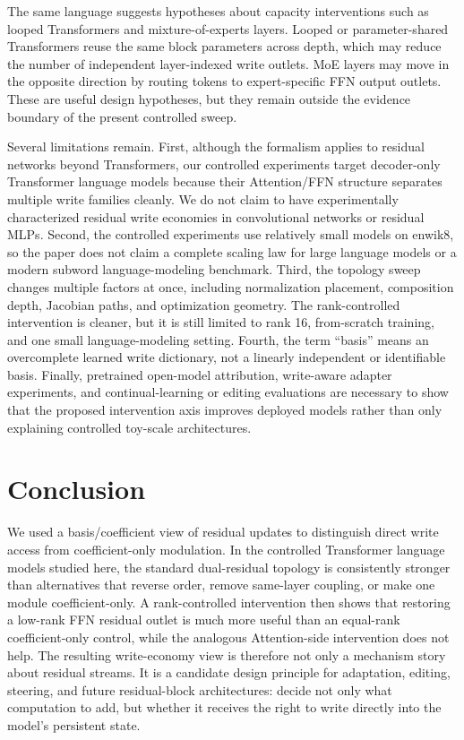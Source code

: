 \documentclass[letterpaper]{article}
\begin{document}
The same language suggests hypotheses about capacity interventions such as
looped Transformers and mixture-of-experts layers. Looped or parameter-shared
Transformers reuse the same block parameters across depth, which may reduce the
number of independent layer-indexed write outlets. MoE layers may move in the
opposite direction by routing tokens to expert-specific FFN output outlets.
These are useful design hypotheses, but they remain outside the evidence
boundary of the present controlled sweep.

Several limitations remain. First, although the formalism applies to residual
networks beyond Transformers, our controlled experiments target decoder-only
Transformer language models because their Attention/FFN structure separates
multiple write families cleanly. We do not claim to have experimentally
characterized residual write economies in convolutional networks or residual
MLPs. Second, the controlled experiments use relatively small models on enwik8,
so the paper does not claim a complete scaling law for large language models or
a modern subword language-modeling benchmark. Third, the topology sweep changes
multiple factors at once, including normalization placement, composition depth,
Jacobian paths, and optimization geometry. The rank-controlled intervention is
cleaner, but it is still limited to rank 16, from-scratch training, and one
small language-modeling setting. Fourth, the term ``basis'' means an
overcomplete learned write dictionary, not a linearly independent or
identifiable basis. Finally, pretrained open-model attribution, write-aware
adapter experiments, and continual-learning or editing evaluations are
necessary to show that the proposed intervention axis improves deployed models
rather than only explaining controlled toy-scale architectures.

\section{Conclusion}

We used a basis/coefficient view of residual updates to distinguish direct
write access from coefficient-only modulation. In the controlled Transformer
language models studied here, the standard dual-residual topology is
consistently stronger than alternatives that reverse order, remove same-layer
coupling, or make one module coefficient-only. A rank-controlled intervention
then shows that restoring a low-rank FFN residual outlet is much more useful
than an equal-rank coefficient-only control, while the analogous Attention-side
intervention does not help. The resulting write-economy view is therefore not
only a mechanism story about residual streams. It is a candidate design
principle for adaptation, editing, steering, and future residual-block
architectures: decide not only what computation to add, but whether it receives
the right to write directly into the model's persistent state.


\end{document}
